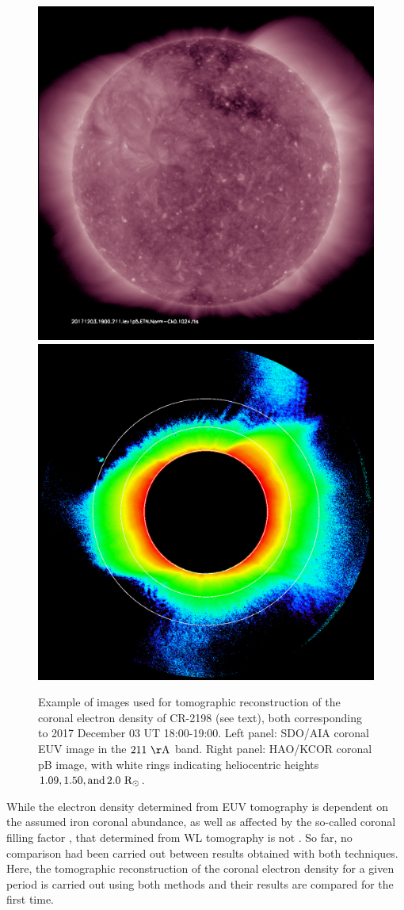 \documentclass[baaa]{baaa}
\begin{document}
\begin{figure}[ht]
  \centering
  \includegraphics[width=0.75\columnwidth]{img_211.pdf}
  \hskip 1cm
  \includegraphics[width=0.75\columnwidth]{20171203_180316_kcor_l1_10min_avg_image.pdf}
  \caption{Example of images used for tomographic reconstruction of the coronal electron density of CR-2198 (see text), both corresponding to 2017 December 03 UT 18:00-19:00. Left panel: SDO/AIA coronal EUV image in the $211~\rm{\AA}$ band. Right panel: HAO/KCOR coronal pB image, with white rings indicating heliocentric heights $1.09, 1.50, \rm{and}\, 2.0~\rm{R}_\odot$.}
  \label{fig_images}
\end{figure}

While the electron density determined from EUV tomography is dependent on the assumed iron coronal abundance, as well as affected by the so-called coronal filling factor \citep{frazin_2009}, that determined from WL tomography is not \citep{frazin_2010}. So far, no comparison had been carried out between results obtained with both techniques. Here, the tomographic reconstruction of the coronal electron density for a given period is carried out using both methods and their results are compared for the first time.
\end{document}
